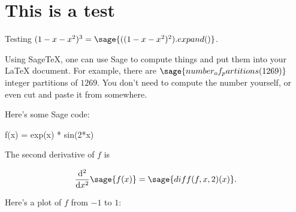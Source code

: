 \documentclass{article}
\begin{document}
\section{This is a test}

Testing $(1-x-x^2)^3 = \sage{((1-x-x^2)^2).expand()}$.

Using Sage\TeX, one can use Sage to compute things and put them into
your \LaTeX{} document. For example, there are
$\sage{number_of_partitions(1269)}$ integer partitions of $1269$.
You don't need to compute the number yourself, or even cut and paste
it from somewhere.

Here's some Sage code:

\begin{sageblock}
f(x) = exp(x) * sin(2*x)
\end{sageblock}

The second derivative of $f$ is

\[
  \frac{\mathrm{d}^{2}}{\mathrm{d}x^{2}} \sage{f(x)} =
  \sage{diff(f, x, 2)(x)}.
\]

Here's a plot of $f$ from $-1$ to $1$:

\end{document}
